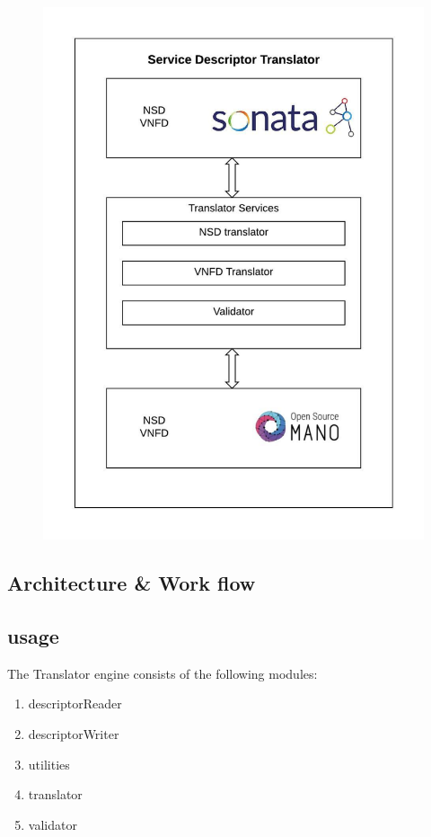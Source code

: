 \begin{figure}
	\centering
	\includegraphics[width=1\linewidth]{"figures/Service Descriptor Translator"}
	\caption{}
	\label{fig:service-descriptor-translator}
\end{figure}

\subsection{Architecture \& Work flow}
\subsection{usage}
The Translator engine consists of the following modules:
\begin{enumerate}
	\item descriptorReader
	\item descriptorWriter
	\item utilities
	\item translator
	\item validator
	
\end{enumerate}

